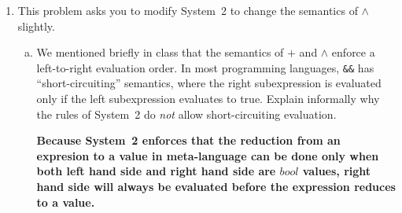 \documentclass{article}
\newcommand{\meta}[1]{{\color{blue}#1}}
\begin{document}
\begin{enumerate}[leftmargin=*,itemindent=*,start=6,label={{\bf Problem \arabic*}.},ref=\arabic*]
\begin{enumerate}[(a)]
{\begin{proof}
\begin{itemize}
\begin{enumerate}
            \end{enumerate}
        \end{itemize}
      \textbf {
        Case: when $\meta{\tau}$ is $bool$. The proof is similar to that of the case when $\meta{\tau}$ is $int$.
      }
      \end{proof}
    }
    
    \textbf{
      Theorem. For every expression $\meta{e}$, value $\meta{v}$, and type $\meta{\tau}$,
      if $\meta{e} \to^* \meta{v}$ and $\vdash \meta{v} : \meta{\tau}$,
      then $\vdash \meta{e} : \meta{\tau}$.
    }
    \begin{proof}
      By induction on $\meta{e} \to^* \meta{v}$.
      \begin{itemize}
        \item $\inferrule{ }{\meta{e} \to^* \meta{e}}$. In this case $\meta{e}$ is $\meta{v}$. Since $\vdash \meta{v} : \meta{\tau}$, $\vdash \meta{e} : \meta{\tau}$.
        \item $\inferrule{\meta{e} \to \meta{e^\prime} \\ \meta{e^\prime} \to^* \meta{v}}{\meta{e} \to^* \meta{v}}$. According to induction hypothesis, and assumptions that $\meta{e^\prime} \to^* \meta{v}$ and $\vdash \meta{v} : \meta{\tau}$, we can get $\vdash \meta{e^\prime} : \meta{\tau}$. According to the assumption that $\meta{e} \to \meta{e^\prime}$ and $\meta{e^\prime} : \meta{\tau}$ and \textit{Lemma 1} proved above, $\meta{e} : \meta{\tau}$ follows.
      \end{itemize}
    \end{proof}

  \end{enumerate}
\item\label{evalorder} This problem asks you to modify System~2 to change the semantics of $\wedge$ slightly.
  \begin{enumerate}[(a)]
  \item We mentioned briefly in class that the semantics of $+$ and $\wedge$ enforce a left-to-right
    evaluation order. In most programming languages, \texttt{\&\&} has ``short-circuiting'' semantics,
    where the right subexpression is evaluated only if the left subexpression evaluates to true. Explain
    informally why the rules of System~2 do \emph{not} allow short-circuiting evaluation.

    \textbf{
      Because System~2 enforces that the reduction from an expresion to a value in meta-language can be done only when both left hand side and right hand side are $bool$ values, right hand side will always be evaluated before the expression reduces to a value.
    }


\end{enumerate}
\end{enumerate}
\end{document}
